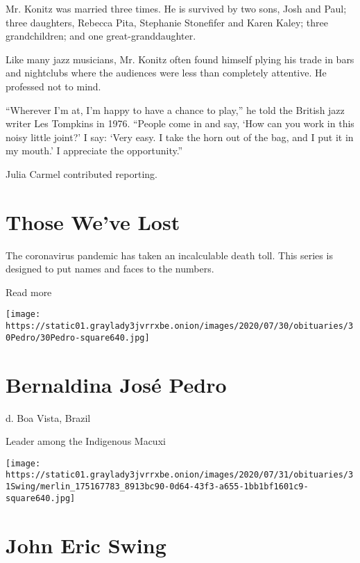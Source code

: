 Mr. Konitz was married three times. He is survived by two sons, Josh and
Paul; three daughters, Rebecca Pita, Stephanie Stonefifer and Karen
Kaley; three grandchildren; and one great-granddaughter.

Like many jazz musicians, Mr. Konitz often found himself plying his
trade in bars and nightclubs where the audiences were less than
completely attentive. He professed not to mind.

``Wherever I'm at, I'm happy to have a chance to play,'' he told the
British jazz writer Les Tompkins in 1976. ``People come in and say, `How
can you work in this noisy little joint?' I say: `Very easy. I take the
horn out of the bag, and I put it in my mouth.' I appreciate the
opportunity.''

Julia Carmel contributed reporting.

\href{https://www.nytimes3xbfgragh.onion/interactive/2020/obituaries/people-died-coronavirus-obituaries.html?action=click\&pgtype=Article\&state=default\&region=BELOW_MAIN_CONTENT\&context=covid_obits_promo}{}

\hypertarget{those-weve-lost}{%
\section{Those We've Lost}\label{those-weve-lost}}

The coronavirus pandemic has taken an incalculable death toll. This
series is designed to put names and faces to the numbers.

Read more

\texttt{[image: https://static01.graylady3jvrrxbe.onion/images/2020/07/30/obituaries/30Pedro/30Pedro-square640.jpg]}

\hypertarget{bernaldina-josuxe9-pedro}{%
\section{Bernaldina José Pedro}\label{bernaldina-josuxe9-pedro}}

d. Boa Vista, Brazil

Leader among the Indigenous Macuxi

\texttt{[image: https://static01.graylady3jvrrxbe.onion/images/2020/07/31/obituaries/31Swing/merlin\_175167783\_8913bc90-0d64-43f3-a655-1bb1bf1601c9-square640.jpg]}

\hypertarget{john-eric-swing}{%
\section{John Eric Swing}\label{john-eric-swing}}

